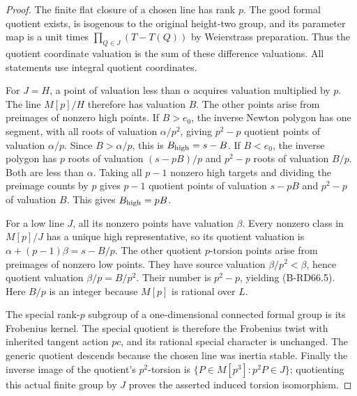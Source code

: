 \begin{proof}
The finite flat closure of a chosen line has rank $p$. The good
formal quotient exists, is isogenous to the original height-two
group, and its parameter map is a unit times
$\prod_{Q\in J}(T-T(Q))$ by Weierstrass preparation. Thus the
quotient coordinate valuation is the sum of these difference
valuations. All statements use integral quotient coordinates.

For $J=H$, a point of valuation less than $\alpha$ acquires
valuation multiplied by $p$. The line $M[p]/H$ therefore has
valuation $B$. The other points arise from preimages of nonzero
high points. If $B>e_0$, the inverse Newton polygon has one segment,
with all roots of valuation $\alpha/p^2$, giving $p^2-p$ quotient
points of valuation $\alpha/p$. Since $B>\alpha/p$, this is
$B_{\rm high}=s-B$.
If $B<e_0$, the inverse polygon has $p$ roots of valuation
$(s-pB)/p$ and $p^2-p$ roots of valuation $B/p$.
Both are less than $\alpha$. Taking all $p-1$ nonzero high targets
and dividing the preimage counts by $p$ gives $p-1$ quotient points
of valuation $s-pB$ and $p^2-p$ of valuation $B$.
This gives $B_{\rm high}=pB$.

For a low line $J$, all its nonzero points have valuation $\beta$.
Every nonzero class in $M[p]/J$ has a unique high representative,
so its quotient valuation is
$\alpha+(p-1)\beta=s-B/p$. The other quotient $p$-torsion points
arise from preimages of nonzero low points. They have source
valuation $\beta/p^2<\beta$, hence quotient valuation
$\beta/p=B/p^2$. Their number is $p^2-p$, yielding (B-RD66.5).
Here $B/p$ is an integer because $M[p]$ is rational over $L$.

The special rank-$p$ subgroup of a one-dimensional connected
formal group is its Frobenius kernel. The special quotient is
therefore the Frobenius twist with inherited tangent action $pc$,
and its rational special character is unchanged. The generic
quotient descends because the chosen line was inertia stable.
Finally the inverse image of the quotient's $p^2$-torsion is
$\{P\in M[p^3]:p^2P\in J\}$; quotienting this actual finite group
by $J$ proves the asserted induced torsion isomorphism.
\end{proof}

